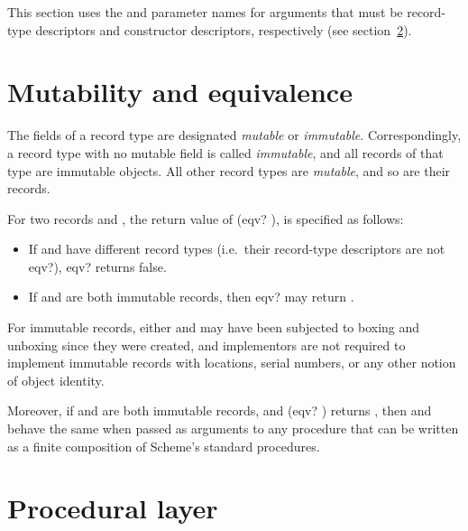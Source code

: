 This section uses the  and 
parameter names for arguments that must be record-type descriptors
and constructor descriptors, respectively (see
section~\ref{recordsproceduralsection}).

\section{Mutability and equivalence}
\label{recordsequivalencesection}
\label{recordsmutabilitysection}

The fields of a record type are designated \textit{mutable} or
\textit{immutable}.  Correspondingly, a record type with no mutable
field is called \textit{immutable}, and all records of that type
are immutable objects.  All other record types are \textit{mutable},
and so are their records.

For two records  and , the return value of {\cf
  (eqv?  )}, is specified as follows:

\begin{itemize}
\item If  and  have different record types (i.e.\
  their record-type descriptors are not {\cf eqv?}), {\cf eqv?}
  returns false.
\item If  and  are both immutable records, then
  {\cf eqv?} may return \schfalse.  
\end{itemize}

\begin{rationale}
  For immutable records, either  and  may have
  been subjected to boxing and unboxing since they were created, and
  implementors are not required to implement immutable records with
  locations, serial numbers, or any other notion of object identity.
\end{rationale}

Moreover, if  and  are both immutable records,
and {\cf (eqv?  )} returns \schtrue, then
\vari{obj} and \varii{obj} behave the same when passed as arguments to
any procedure that can be written as a finite composition of Scheme's
standard procedures.

\section{Procedural layer}
\label{recordsproceduralsection}

